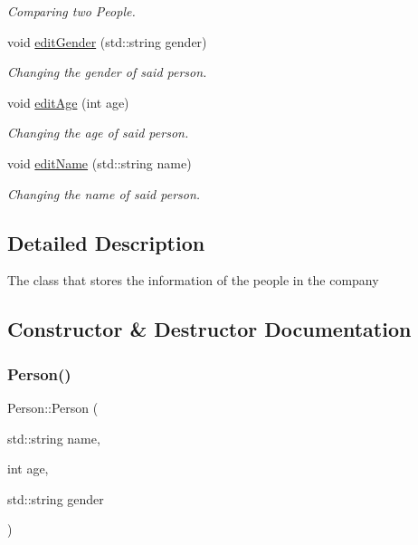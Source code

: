 \begin{DoxyCompactItemize}
\begin{DoxyCompactList}\small\item\em Comparing two People. \end{DoxyCompactList}\item 
void \mbox{\hyperlink{class_person_a3462440c2938aaea073cdaeeb9c0ad9d}{edit\+Gender}} (std\+::string gender)
\begin{DoxyCompactList}\small\item\em Changing the gender of said person. \end{DoxyCompactList}\item 
void \mbox{\hyperlink{class_person_af00065ecb43ca488a2f90fe5dc796095}{edit\+Age}} (int age)
\begin{DoxyCompactList}\small\item\em Changing the age of said person. \end{DoxyCompactList}\item 
void \mbox{\hyperlink{class_person_ade234dfe2fb73a9ae41bac93b52c17c6}{edit\+Name}} (std\+::string name)
\begin{DoxyCompactList}\small\item\em Changing the name of said person. \end{DoxyCompactList}\end{DoxyCompactItemize}


\subsection{Detailed Description}
The class that stores the information of the people in the company 

\subsection{Constructor \& Destructor Documentation}
\mbox{\label{class_person_a19ba5bb7e92c776268b3d453b4ef55b2}} 
\subsubsection{\texorpdfstring{Person()}{Person()}}
{\footnotesize\ttfamily Person\+::\+Person (\begin{DoxyParamCaption}\item[{std\+::string}]{name,  }\item[{int}]{age,  }\item[{std\+::string}]{gender }\end{DoxyParamCaption})}




